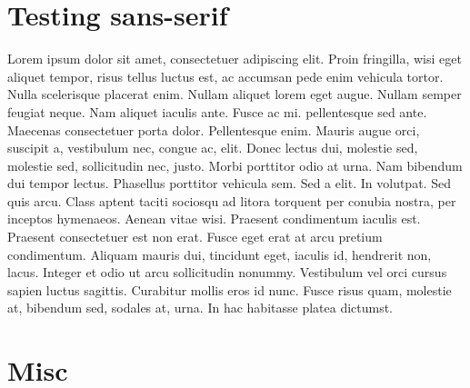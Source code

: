 \documentclass[12pt,a4paper]{article}
\begin{document}
\section{Testing sans-serif}
\textsf{
Lorem ipsum dolor sit amet, consectetuer adipiscing elit. Proin fringilla, wisi
eget aliquet tempor, risus tellus luctus est, ac accumsan pede enim vehicula
tortor. Nulla  scelerisque placerat enim. Nullam aliquet
lorem eget augue. Nullam semper feugiat neque. Nam aliquet iaculis ante. Fusce
ac mi.  pellentesque sed ante. Maecenas consectetuer
porta dolor. Pellentesque enim. Mauris augue orci, suscipit a, vestibulum nec,
 congue ac, elit. Donec lectus dui, molestie sed,
molestie sed, sollicitudin nec, justo. Morbi porttitor odio at urna. Nam
bibendum dui tempor lectus. Phasellus  porttitor
vehicula sem. Sed a elit.
}
\textsf{
In volutpat. Sed quis arcu. Class aptent taciti sociosqu ad litora torquent per
conubia nostra, per inceptos  hymenaeos. Aenean vitae
wisi. Praesent condimentum iaculis est. Praesent consectetuer est non erat.
Fusce eget erat at arcu pretium condimentum. Aliquam 
mauris dui, tincidunt eget, iaculis id, hendrerit non, lacus. Integer et odio ut
arcu sollicitudin nonummy. Vestibulum vel orci cursus sapien luctus
 sagittis. Curabitur mollis eros id nunc. Fusce risus
quam, molestie at, bibendum sed, sodales at, urna. In hac habitasse platea
 dictumst.
}


\section{Misc}

\HepParticle{\pi}{}{}
\HepParticle{\lambda}{}{}
\HepGenParticle{\pi}{}{}
\HepGenParticle{\lambda}{}{}

\end{document}
